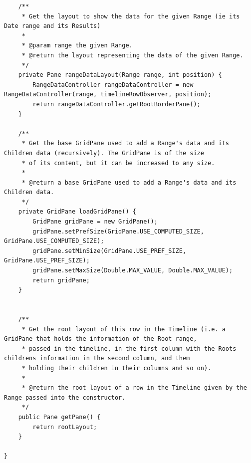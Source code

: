 \begin{lstlisting}
    /**
     * Get the layout to show the data for the given Range (ie its Date range and its Results)
     *
     * @param range the given Range.
     * @return the layout representing the data of the given Range.
     */
    private Pane rangeDataLayout(Range range, int position) {
        RangeDataController rangeDataController = new RangeDataController(range, timelineRowObserver, position);
        return rangeDataController.getRootBorderPane();
    }

    /**
     * Get the base GridPane used to add a Range's data and its Children data (recursively). The GridPane is of the size
     * of its content, but it can be increased to any size.
     *
     * @return a base GridPane used to add a Range's data and its Children data.
     */
    private GridPane loadGridPane() {
        GridPane gridPane = new GridPane();
        gridPane.setPrefSize(GridPane.USE_COMPUTED_SIZE, GridPane.USE_COMPUTED_SIZE);
        gridPane.setMinSize(GridPane.USE_PREF_SIZE, GridPane.USE_PREF_SIZE);
        gridPane.setMaxSize(Double.MAX_VALUE, Double.MAX_VALUE);
        return gridPane;
    }


    /**
     * Get the root layout of this row in the Timeline (i.e. a GridPane that holds the information of the Root range,
     * passed in the timeline, in the first column with the Roots childrens information in the second column, and them
     * holding their children in their columns and so on).
     *
     * @return the root layout of a row in the Timeline given by the Range passed into the constructor.
     */
    public Pane getPane() {
        return rootLayout;
    }

}
\end{lstlisting}
